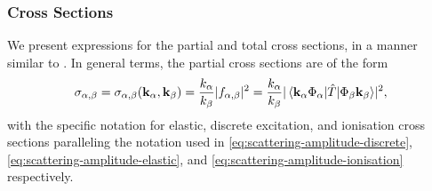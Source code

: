 \documentclass[draft]{article}
\begin{document}
\subsubsection{Cross Sections}
\label{sec:cross-sections}

We present expressions for the partial and total cross sections, in a manner
similar to \cite[10]{BRAY19951}.
In general terms, the partial cross sections are of the form
\begin{equation}
  \label{eq:partial-cross-sections}
  \sigma_{\alpha, \beta}
  =
  \sigma_{\alpha, \beta}(\vb{k}_{\alpha}, \vb{k}_{\beta})
  =
  \dfrac{k_{\alpha}}{k_{\beta}}
  \lvert f_{\alpha, \beta}\rvert^{2}
  =
  \dfrac{k_{\alpha}}{k_{\beta}}
  \lvert
    \mel*
    {\vb{k}_{\alpha} \Phi_{\alpha}}
    {\hat{T}}
    {\Phi_{\beta} \vb{k}_{\beta}}
  \rvert^{2}
  ,
\end{equation}
with the specific notation for elastic, discrete excitation, and ionisation
cross sections paralleling the notation used in
\autoref{eq:scattering-amplitude-discrete},
\autoref{eq:scattering-amplitude-elastic}, and
\autoref{eq:scattering-amplitude-ionisation} respectively.
\end{document}
